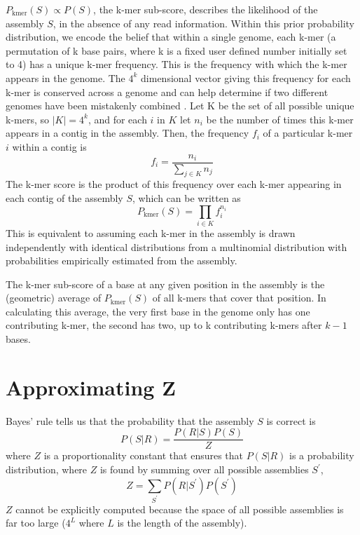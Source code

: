\documentclass[phd,tocprelim]{cornell}
\begin{document}
$P_{\text{kmer}}(S) \propto P(S)$, the k-mer sub-score, describes the likelihood of the assembly $S$, in the absence of any read information.  Within this prior probability distribution, we encode the belief that within a single genome, each k-mer (a permutation of k base pairs, where k is a fixed user defined number initially set to 4) has a unique k-mer frequency. This is the frequency with which the k-mer appears in the genome.  The $4^{k}$ dimensional vector giving this frequency for each k-mer is conserved across a genome and can help determine if two different genomes have been mistakenly combined \cite{Teeling2004} \cite{Woyke2006}. Let K be the set of all possible unique k-mers, so $|K| = 4^{k}$, and for each $i$ in $K$ let $n_{i}$ be the number of times this k-mer appears in a contig in the assembly. Then, the frequency $f_{i}$ of a particular k-mer $i$ within a contig is
\begin{equation}
    f_{i} = \frac{n_{i}}{\sum_{j\in K}n_{j}}
\end{equation}
The k-mer score is the product of this frequency over each k-mer appearing in each contig of the assembly $S$, which can be written as
\begin{equation}
    P_{\text{kmer}}(S) = \prod_{i\in K} f_{i}^{n_{i}}
\end{equation}
This is equivalent to assuming each k-mer in the assembly is drawn independently with identical distributions from a multinomial distribution with probabilities empirically estimated from the assembly.

The k-mer sub-score of a base at any given position in the assembly is the (geometric) average of $P_{\text{kmer}}(S)$ of all k-mers that cover that position. In calculating this average, the very first base in the genome only has one contributing k-mer, the second has two, up to k contributing k-mers after $k-1$ bases.



\section{Approximating Z} %
\label{sec:Approximating Z}

Bayes’ rule tells us that the probability that the assembly $S$ is correct is
\begin{equation}
    P(S|R) = \frac{P(R|S)P(S)}{Z}
\end{equation}
where $Z$ is a proportionality constant that ensures that $P(S|R)$ is a probability distribution, where $Z$ is found by summing over all possible assemblies $S^{\prime}$,
\begin{equation}
    Z = \sum_{S^{\prime}}P(R|S^{\prime})P(S^{\prime})
\end{equation}
$Z$ cannot be explicitly computed because the space of all possible assemblies is far too large ($4^{L}$ where $L$ is the length of the assembly). 
\end{document}
